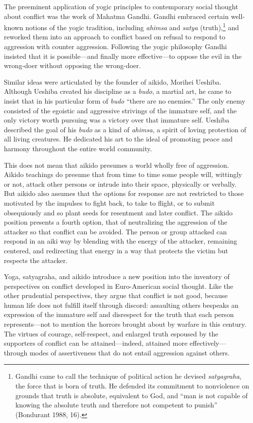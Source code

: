 The preeminent application of yogic principles to contemporary social thought about conflict was the work of Mahatma Gandhi. Gandhi embraced certain well-known notions of the yogic tradition, including \emph{ahimsa} and \emph{satya} (truth),\footnote{Gandhi came to call the technique of political action he devised \emph{satyagraha}, the force that is born of truth. He defended its commitment to nonviolence on grounds that truth is absolute, equivalent to God, and ``man is not capable of knowing the absolute truth and therefore not competent to punish'' (Bondurant 1988, 16).} and reworked them into an approach to conflict based on refusal to respond to aggression with counter aggression. Following the yogic philosophy Gandhi insisted that it is possible---and finally more effective---to oppose the evil in the wrong-doer without opposing the wrong-doer. 

Similar ideas were articulated by the founder of aikido, Morihei Ueshiba. Although Ueshiba created his discipline as a \emph{budo}, a martial art, he came to insist that in his particular form of \emph{budo} ``there are no enemies.'' The only enemy consisted of the egoistic and aggressive strivings of the immature self, and the only victory worth pursuing was a victory over that immature self. Ueshiba described the goal of his \emph{budo} as a kind of \emph{ahimsa}, a spirit of loving protection of all living creatures. He dedicated his art to the ideal of promoting peace and harmony throughout the entire world community. 

This does not mean that aikido presumes a world wholly free of aggression. Aikido teachings do presume that from time to time some people will, wittingly or not, attack other persons or intrude into their space, physically or verbally. But aikido also assumes that the options for response are not restricted to those motivated by the impulses to fight back, to take to flight, or to submit obsequiously and so plant seeds for resentment and later conflict. The aikido position presents a fourth option, that of neutralizing the aggression of the attacker so that conflict can be avoided. The person or group attacked can respond in an aiki way by blending with the energy of the attacker, remaining centered, and redirecting that energy in a way that protects the victim but respects the attacker. 

Yoga, satyagraha, and aikido introduce a new position into the inventory of perspectives on conflict developed in Euro-American social thought. Like the other prudential perspectives, they argue that conflict is not good, because human life does not fulfill itself through discord: assaulting others bespeaks an expression of the immature self and disrespect for the truth that each person represents---not to mention the horrors brought about by warfare in this century. The virtues of courage, self-respect, and enlarged truth espoused by the supporters of conflict can be attained---indeed, attained more effectively---through modes of assertiveness that do not entail aggression against others. 

